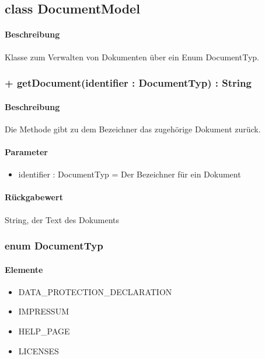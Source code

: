 \subsection{class DocumentModel}
\paragraph*{Beschreibung}
Klasse zum Verwalten von Dokumenten über ein Enum DocumentTyp.

\subsubsection{+ getDocument(identifier : DocumentTyp) : String}%
\paragraph*{Beschreibung}
Die Methode gibt zu dem Bezeichner das zugehörige Dokument zurück.
\paragraph*{Parameter}
\begin{itemize}
    \item identifier : DocumentTyp = Der Bezeichner für ein Dokument
\end{itemize}
\paragraph*{Rückgabewert}
String, der Text des Dokuments


\subsubsection{enum DocumentTyp}
\paragraph*{Elemente}
\begin{itemize}
    \item DATA_PROTECTION_DECLARATION
    \item IMPRESSUM
    \item HELP_PAGE
    \item LICENSES
\end{itemize}